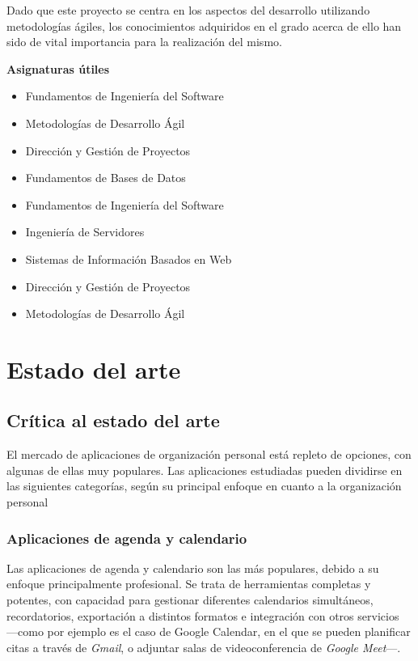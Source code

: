 \documentclass[10pt, a4paper]{aqademic}
\begin{document}
Dado que este proyecto se centra en los aspectos del desarrollo utilizando metodologías ágiles, los conocimientos adquiridos en el grado acerca de ello han sido de vital importancia para la realización del mismo.

\textbf{Asignaturas útiles}

\begin{itemize}
	\item Fundamentos de Ingeniería del Software
	\item Metodologías de Desarrollo Ágil
	\item Dirección y Gestión de Proyectos
\end{itemize}


\begin{itemize}
	\item Fundamentos de Bases de Datos
	\item Fundamentos de Ingeniería del Software
	\item Ingeniería de Servidores
	\item Sistemas de Información Basados en Web
	\item Dirección y Gestión de Proyectos
	\item Metodologías de Desarrollo Ágil
\end{itemize}

\chapter{Estado del arte}

\section{Crítica al estado del arte}

El mercado de aplicaciones de organización personal está repleto de opciones, con algunas de ellas muy populares. Las aplicaciones estudiadas pueden dividirse en las siguientes categorías, según su principal enfoque en cuanto a la organización personal

\subsection*{Aplicaciones de agenda y calendario}

Las aplicaciones de agenda y calendario son las más populares, debido a su enfoque principalmente profesional. Se trata de herramientas completas y potentes, con capacidad para gestionar diferentes calendarios simultáneos, recordatorios, exportación a distintos formatos e integración con otros servicios ---como por ejemplo es el caso de Google Calendar, en el que se pueden planificar citas a través de \textit{Gmail}, o adjuntar salas de videoconferencia de \textit{Google Meet}---. 
\end{document}
